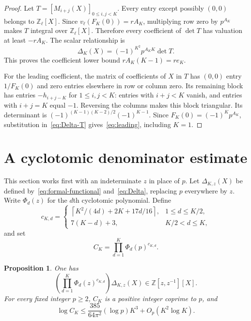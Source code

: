 \documentclass[11pt,letterpaper]{article}
\numberwithin{equation}{section}
\newtheorem{proposition}[theorem]{Proposition}
\theoremstyle{remark}
\newcommand{\Z}{\mathbb Z}
\begin{document}
\begin{proof}
Let $T=[M_{i+j}(X)]_{0\le i,j<K}$. Every entry except possibly $(0,0)$ belongs to $\Z_\ell[X]$. Since $v_\ell(F_K(0))=rA_K$, multiplying row zero by $p^{A_K}$ makes $T$ integral over $\Z_\ell[X]$. Therefore every coefficient of $\det T$ has valuation at least $-rA_K$. The scalar relationship is
\begin{equation}\label{eq:Delta-T}
 \Delta_K(X)=(-1)^{K^2}p^{A_KK}\det T.
\end{equation}
This proves the coefficient lower bound $rA_K(K-1)=re_K$.

For the leading coefficient, the matrix of coefficients of $X$ in $T$ has $(0,0)$ entry $1/F_K(0)$ and zero entries elsewhere in row or column zero. Its remaining block has entries $-h_{i+j-K}$ for $1\le i,j<K$: entries with $i+j<K$ vanish, and entries with $i+j=K$ equal $-1$. Reversing the columns makes this block triangular. Its determinant is $(-1)^{(K-1)(K-2)/2}(-1)^{K-1}$. Since $F_K(0)=(-1)^Kp^{A_K}$, substitution in~\eqref{eq:Delta-T} gives~\eqref{eq:leading}, including $K=1$.
\end{proof}

\section{A cyclotomic denominator estimate}

This section works first with an indeterminate $z$ in place of $p$. Let $\Delta_{K,z}(X)$ be defined by~\eqref{eq:formal-functional} and~\eqref{eq:Delta}, replacing $p$ everywhere by $z$. Write $\Phi_d(z)$ for the $d$th cyclotomic polynomial. Define
\begin{equation}\label{eq:cd}
 c_{K,d}=\begin{cases}
 \left\lceil K^2/(4d)+2K+17d/16\right\rceil,&1\le d\le K/2,\\
 7(K-d)+3,&K/2<d\le K,
 \end{cases}
\end{equation}
and set
\begin{equation}\label{eq:CK}
 C_K=\prod_{d=1}^K\Phi_d(p)^{c_{K,d}}.
\end{equation}

\begin{proposition}\label{prop:denominators}
One has
\begin{equation}\label{eq:laurent-integral}
 \left(\prod_{d=1}^K\Phi_d(z)^{c_{K,d}}\right)\Delta_{K,z}(X)
       \in\Z[z,z^{-1}][X].
\end{equation}
For every fixed integer $p\ge2$, $C_K$ is a positive integer coprime to $p$, and
\begin{equation}\label{eq:denom-growth}
 \log C_K\le\frac{385}{64\pi^2}(\log p)K^3
                   +O_p(K^2\log K).
\end{equation}
\end{proposition}
\end{document}
